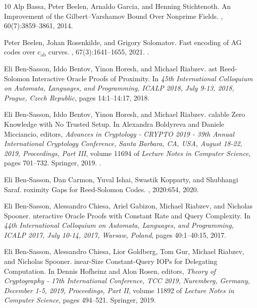 \documentclass[10pt,a4paper]{article}
\theoremstyle{plain}
\theoremstyle{plain}
\theoremstyle{definition}
\theoremstyle{remark}
\theoremstyle{plain}
\begin{document}
\begin{thebibliography}{10}
Alp {Bassa}, Peter {Beelen}, Arnaldo {Garcia}, and Henning {Stichtenoth}.
\newblock An {I}mprovement of the {G}ilbert–{V}arshamov {B}ound {O}ver
  {N}onprime {F}ields.
,
  60(7):3859--3861, 2014.

Peter Beelen, Johan Rosenkilde, and Grigory Solomatov.
\newblock Fast encoding of {AG} codes over c\({}_{\mbox{ab}}\) curves.
, 67(3):1641--1655, 2021.
\newblock \href {https://doi.org/10.1109/TIT.2020.3042248}
  {}.

Eli Ben{-}Sasson, Iddo Bentov, Yinon Horesh, and Michael Riabzev.
ast {R}eed-{S}olomon {I}nteractive {O}racle {P}roofs of
  {P}roximity.
\newblock In {\em 45th International Colloquium on Automata, Languages, and
  Programming, {ICALP} 2018, July 9-13, 2018, Prague, Czech Republic}, pages
  14:1--14:17, 2018.

Eli Ben{-}Sasson, Iddo Bentov, Yinon Horesh, and Michael Riabzev.
calable {Z}ero {K}nowledge with {N}o {T}rusted {S}etup.
\newblock In Alexandra Boldyreva and Daniele Micciancio, editors, {\em Advances
  in Cryptology - {CRYPTO} 2019 - 39th Annual International Cryptology
  Conference, Santa Barbara, CA, USA, August 18-22, 2019, Proceedings, Part
  {III}}, volume 11694 of {\em Lecture Notes in Computer Science}, pages
  701--732. Springer, 2019.
\newblock \href {https://doi.org/10.1007/978-3-030-26954-8_23}
  {}.

Eli Ben{-}Sasson, Dan Carmon, Yuval Ishai, Swastik Kopparty, and Shubhangi
  Saraf.
roximity {G}aps for {R}eed-{S}olomon {C}odes.
, 2020:654, 2020.

Eli Ben{-}Sasson, Alessandro Chiesa, Ariel Gabizon, Michael Riabzev, and
  Nicholas Spooner.
nteractive {O}racle {P}roofs with {C}onstant {R}ate and {Q}uery
  {C}omplexity.
\newblock In {\em 44th International Colloquium on Automata, Languages, and
  Programming, {ICALP} 2017, July 10-14, 2017, Warsaw, Poland}, pages
  40:1--40:15, 2017.

Eli Ben{-}Sasson, Alessandro Chiesa, Lior Goldberg, Tom Gur, Michael Riabzev,
  and Nicholas Spooner.
inear-{S}ize {C}onstant-{Q}uery {I}{O}{P}s for {D}elegating
  {C}omputation.
\newblock In Dennis Hofheinz and Alon Rosen, editors, {\em Theory of
  Cryptography - 17th International Conference, {TCC} 2019, Nuremberg, Germany,
  December 1-5, 2019, Proceedings, Part {II}}, volume 11892 of {\em Lecture
  Notes in Computer Science}, pages 494--521. Springer, 2019.


\end{thebibliography}
\end{document}
